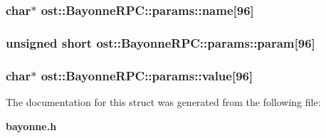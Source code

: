 \subsubsection[{name}]{\setlength{\rightskip}{0pt plus 5cm}char$\ast$ {\bf ost::BayonneRPC::params::name}[96]}\label{structost_1_1_bayonne_r_p_c_1_1params_ab63d8eadb32e6daaa686e65a263c259e}
\subsubsection[{param}]{\setlength{\rightskip}{0pt plus 5cm}unsigned short {\bf ost::BayonneRPC::params::param}[96]}\label{structost_1_1_bayonne_r_p_c_1_1params_ad2fded8fb78ad65ac839ed5884fafadc}
\subsubsection[{value}]{\setlength{\rightskip}{0pt plus 5cm}char$\ast$ {\bf ost::BayonneRPC::params::value}[96]}\label{structost_1_1_bayonne_r_p_c_1_1params_a10dd809723e63dcf08ff0cdfd839f0a5}


The documentation for this struct was generated from the following file:\begin{DoxyCompactItemize}
\item 
{\bf bayonne.h}\end{DoxyCompactItemize}
